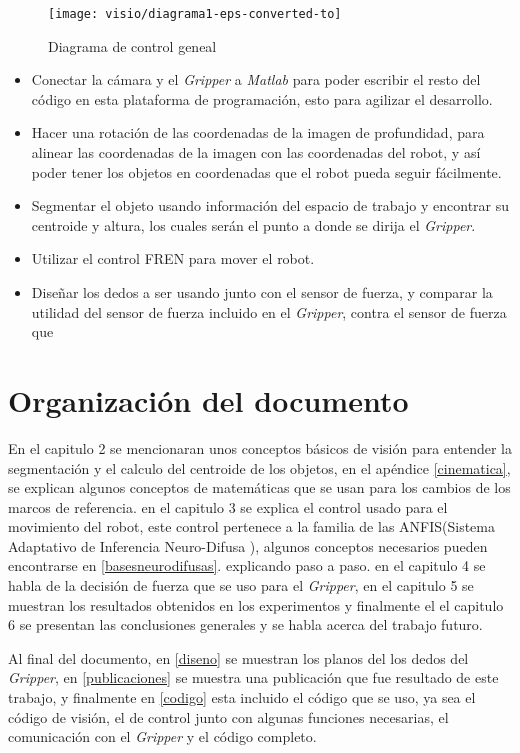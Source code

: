 \begin{figure}[h]
	\centering
	\texttt{[image: visio/diagrama1-eps-converted-to]}
	\caption{Diagrama de control geneal}
	\label{fig:diagrama1-eps-converted-to}
\end{figure}
\begin{itemize}

\item Conectar la cámara y el \textit{Gripper} a \textit{Matlab} para poder escribir el resto del código en esta plataforma de programación, esto para agilizar el desarrollo.

\item Hacer una rotación de las coordenadas de la imagen de profundidad, para alinear las coordenadas de la imagen con las coordenadas del robot, y así poder tener los objetos en coordenadas que el robot pueda seguir fácilmente.

\item Segmentar el objeto usando información del espacio de trabajo y encontrar su centroide y altura, los cuales serán el punto a donde se dirija el \textit{Gripper}.

\item Utilizar el control FREN para mover el robot.

\item Diseñar los dedos a ser usando junto con el sensor de fuerza, y comparar la utilidad del sensor de fuerza incluido en el \textit{Gripper}, contra el sensor de fuerza que 
\end{itemize}

\section{Organización del documento}


En el capitulo 2 se mencionaran unos conceptos básicos de visión para entender la segmentación y el calculo del centroide de los objetos, en el apéndice \cref{cinematica}, se explican algunos conceptos de matemáticas que se usan para los cambios de los marcos de referencia. en el capitulo 3 se explica el control usado para el movimiento del robot, este control pertenece a la familia de las ANFIS(Sistema Adaptativo de Inferencia Neuro-Difusa ), algunos conceptos necesarios pueden encontrarse en \cref{basesneurodifusas}. explicando paso a paso. en el capitulo 4 se habla de la decisión de fuerza que se uso para el \textit{Gripper}, 
en el capitulo 5 se muestran los resultados obtenidos en los experimentos y finalmente el el capitulo 6 se presentan las conclusiones generales y se habla acerca del trabajo futuro.

Al final del documento, en \cref{diseno} se muestran los planos del los dedos del \textit{Gripper}, en \cref{publicaciones} se muestra una publicación que fue resultado de este trabajo, y finalmente en \cref{codigo} esta incluido el código que se uso, ya sea el código de visión, el de control junto con algunas funciones necesarias, el comunicación con el \textit{Gripper} y el código completo.


